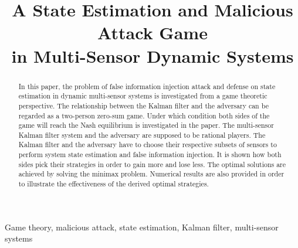 \documentclass{article}
\title{A  State Estimation and Malicious Attack Game \\in Multi-Sensor Dynamic Systems}
\begin{document}
\newtheorem{theorem}{Theorem}
\newtheorem{proposition}{Proposition}
\theoremstyle{definition}
\newcommand{\beq}{\begin{equation}}
\newcommand{\eeq}{\end{equation}}
\newcommand{\beqa}{\begin{eqnarray}}
\newcommand{\eeqa}{\end{eqnarray}}
\newcommand{\nn}{\nonumber}
\maketitle
\begin{abstract}
In this paper, the problem of false information injection attack and defense on state estimation  in dynamic multi-sensor systems is investigated from a game theoretic perspective. The relationship between the Kalman filter  and the adversary can be regarded as a two-person zero-sum game. Under which condition both sides of the game will reach the Nash equilibrium is investigated in the  paper. The multi-sensor Kalman filter system and the adversary are supposed to be rational players. The Kalman filter and the adversary have to choose their respective subsets of sensors to perform system state estimation and false information injection. It is shown how both sides pick their strategies in order  to gain more and lose less. The optimal solutions are achieved by solving the minimax problem. Numerical results are also provided in order to illustrate the effectiveness of the derived optimal strategies.
\end{abstract}
\begin{keywords}
 Game theory, malicious attack, state estimation, Kalman filter, multi-sensor systems
\end{keywords}
\end{document}
